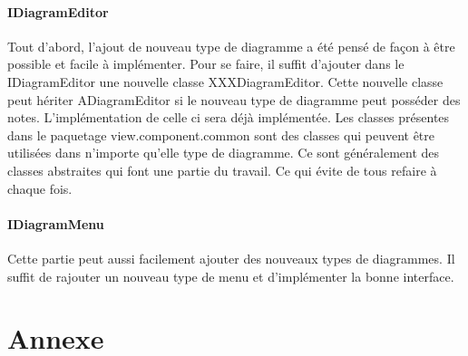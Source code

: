 \documentclass[a4paper,10pt]{article}
\begin{document}
  \paragraph{IDiagramEditor}
    Tout d'abord, l'ajout de nouveau type de diagramme a été pensé de façon à être possible et facile à implémenter. 
    Pour se faire, il suffit d'ajouter dans le IDiagramEditor une 
    nouvelle classe XXXDiagramEditor. Cette nouvelle classe peut hériter ADiagramEditor si le nouveau type de diagramme peut posséder des notes.
    L'implémentation de celle ci sera déjà implémentée.
    Les classes présentes dans le paquetage view.component.common sont des classes qui peuvent être utilisées dans n'importe qu'elle type de diagramme. Ce
    sont généralement des classes abstraites qui font une partie du travail. Ce qui évite de tous refaire à chaque fois.
    
  \paragraph{IDiagramMenu}
    Cette partie peut aussi facilement ajouter des nouveaux types de diagrammes. Il suffit de rajouter un nouveau type de menu et d'implémenter la bonne interface.

    \newpage
\section{Annexe}
\end{document}
